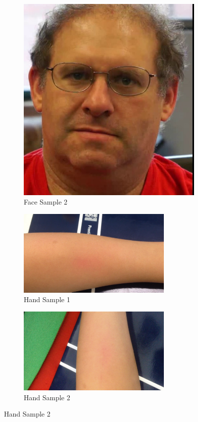 \begin{figure}[!h]
\begin{subfigure}{.5\textwidth}
  \includegraphics[scale=0.35]{img/eulerian/test/man2}
  \caption{Face Sample 2}
  \label{fig:sub2}
\end{subfigure}
\begin{subfigure}{.5\textwidth}
  \centering
  \includegraphics[width=7.5cm]{img/eulerian/test/hand}
  \caption{Hand Sample 1}
  \label{fig:sub1}
\end{subfigure}%
\begin{subfigure}{.5\textwidth}
  \centering
  \includegraphics[width=7.5cm]{img/eulerian/test/hand2}
  \caption{Hand Sample 2}

\end{subfigure}
\end{figure}
